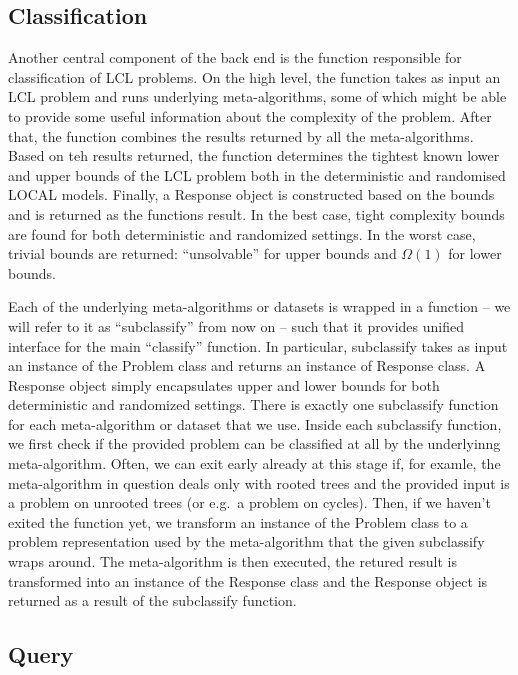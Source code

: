 \subsection{Classification}

Another central component of the back end is
the function responsible for classification of LCL problems.
On the high level, the function takes as input an LCL problem and
runs underlying meta-algorithms, some of which might be
able to provide some useful information about the complexity of the
problem. After that, the function combines the results
returned by all the meta-algorithms. Based on teh results returned,
the function determines the tightest known lower and upper bounds of
the LCL problem both in the deterministic and randomised LOCAL
models. Finally, a Response object is constructed based on the bounds
and is returned as the functions result. In the best case, tight
complexity bounds are found for both deterministic and randomized
settings. In the worst case, trivial bounds are returned:
``unsolvable'' for upper bounds and $\Omega(1)$ for lower bounds.

Each of the underlying meta-algorithms or datasets is wrapped
in a function -- we will refer to it as ``subclassify'' from now on -- such
that it provides unified interface for the main
``classify'' function. In particular, subclassify takes
as input an instance of the Problem class and
returns an instance of Response class. A Response object
simply encapsulates upper and lower bounds for both
deterministic and randomized settings. There is
exactly one subclassify function for each meta-algorithm
or dataset that we use. Inside each subclassify function,
we first check if the provided problem can be classified
at all by the underlyinng meta-algorithm. Often, we can
exit early already at this stage if, for examle, the meta-algorithm
in question deals only with rooted trees and the provided input is a 
problem on unrooted trees (or e.g.\ a problem on cycles). Then,
if we haven't exited the function yet,
we transform an instance of the Problem class to a problem
representation used by the meta-algorithm that the given
subclassify wraps around. The meta-algorithm is then executed,
the retured result is transformed into an instance of the
Response class and the Response object is returned as
a result of the subclassify function.

\subsection{Query}

